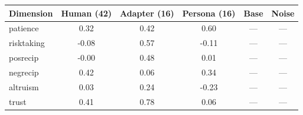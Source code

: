 \begin{tabular}{lccccc}
\toprule
Dimension & Human (42) & Adapter (16) & Persona (16) & Base & Noise \\
\midrule
patience & 0.32 & 0.42 & 0.60 & --- & --- \\
risktaking & -0.08 & 0.57 & -0.11 & --- & --- \\
posrecip & -0.00 & 0.48 & 0.01 & --- & --- \\
negrecip & 0.42 & 0.06 & 0.34 & --- & --- \\
altruism & 0.03 & 0.24 & -0.23 & --- & --- \\
trust & 0.41 & 0.78 & 0.06 & --- & --- \\
\bottomrule
\end{tabular}
